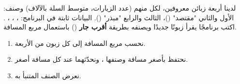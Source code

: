 \begin{statement}
لدينا أربعة زبائن معروفين، لكل منهم (عدد الزيارات، متوسط السلة بالآلاف) وصنف: الأول والثاني "مقتصد" ()، الثالث والرابع "مبذر" (). البيانات ثابتة في البرنامج: ، ، ، . اكتب برنامجًا يقرأ زبونًا جديدًا ويصنفه بطريقة \textbf{أقرب جار} () باستعمال مربع المسافة.
\end{statement}
\begin{stepsbox}\begin{enumerate}
\item نحسب مربع المسافة إلى كل زبون من الأربعة.
\item نحتفظ بأصغر مسافة  وصنفها ، ونحدّثهما عند كل مسافة أصغر.
\item نعرض الصنف المتنبأ به.
\end{enumerate}\end{stepsbox}
